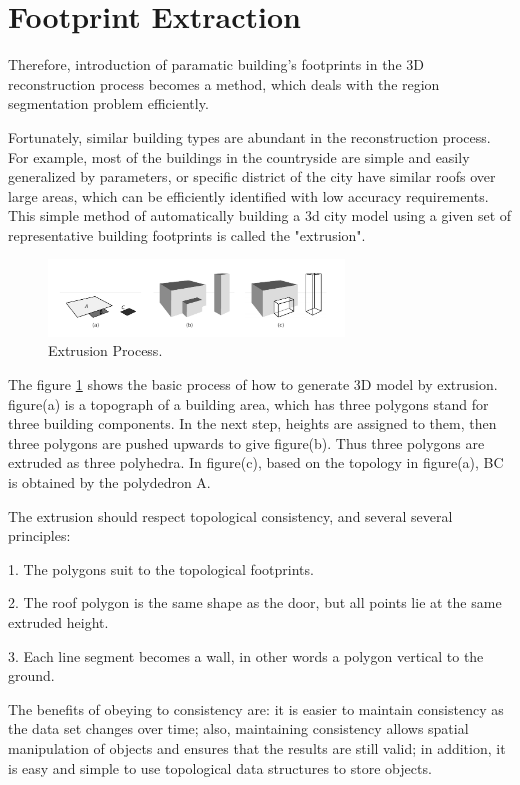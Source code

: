\section{Footprint Extraction} 

Therefore, introduction of paramatic building's footprints in the 3D reconstruction process becomes a method, which deals with the region segmentation problem efficiently. 

Fortunately, similar building types are abundant in the reconstruction process. For example, most of the buildings in the countryside are simple and easily generalized by parameters, or specific district of the city have similar roofs over large areas, which can be efficiently identified with low accuracy requirements. This simple method of automatically building a 3d city model using a given set of representative building footprints is called the "extrusion".

\begin{figure}[htb]
	\centering
	\includegraphics[width=0.7\textwidth]{gfx/extrusion}  	  	 	
	\caption{Extrusion Process.\cite{ledoux2011topologically}}
	\label{fig:extrusion}
\end{figure}

The figure \ref{fig:extrusion} shows the basic process of how to generate 3D model by extrusion. figure(a) is a topograph of a building area, which has three polygons stand for three building components. In the next step, heights are assigned to them, then three polygons are pushed upwards to give figure(b). Thus three polygons are extruded as three polyhedra. In figure(c), based on the topology in figure(a), BC is obtained by the polydedron A.

The extrusion should respect topological consistency, and several several principles: 

1. The polygons suit to the topological footprints. 

2. The roof polygon is the same shape as the door, but all points lie at the same extruded height. 

3. Each line segment becomes a wall, in other words a polygon vertical to the ground.

The benefits of obeying to consistency are: it is easier to maintain consistency as the data set changes over time; also, maintaining consistency allows spatial manipulation of objects and ensures that the results are still valid; in addition, it is easy and simple to use topological data structures to store objects.

